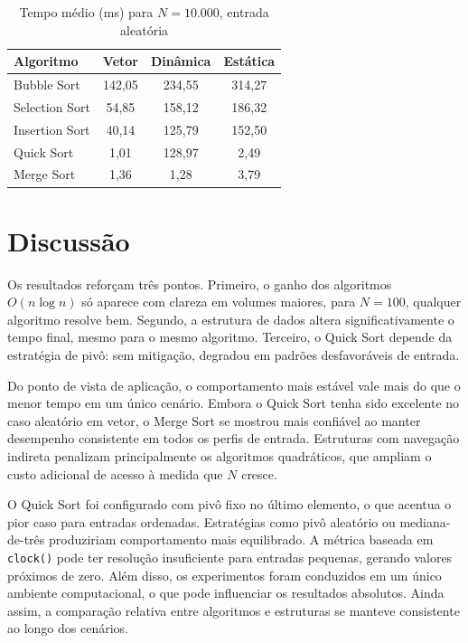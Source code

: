 \documentclass[conference]{IEEEtran}
\begin{document}
\begin{table}[htbp]
\centering
\caption{Tempo médio (ms) para $N=10.000$, entrada aleatória}
\label{tab:resultados}
\renewcommand{\arraystretch}{1.2}
\begin{tabular}{lccc}
\toprule
\textbf{Algoritmo} & \textbf{Vetor} & \textbf{Dinâmica} & \textbf{Estática} \\
\midrule
Bubble Sort    & 142,05 & 234,55 & 314,27 \\
Selection Sort &  54,85 & 158,12 & 186,32 \\
Insertion Sort &  40,14 & 125,79 & 152,50 \\
Quick Sort     &   1,01 & 128,97 &   2,49 \\
Merge Sort     &   1,36 &   1,28 &   3,79 \\
\bottomrule
\end{tabular}
\end{table}

\section{Discussão}

Os resultados reforçam três pontos. Primeiro, o ganho dos algoritmos $O(n \log n)$ só aparece com clareza em volumes maiores, para $N = 100$, qualquer algoritmo resolve bem. Segundo, a estrutura de dados altera significativamente o tempo final, mesmo para o mesmo algoritmo. Terceiro, o Quick Sort depende da estratégia de pivô: sem mitigação, degradou em padrões desfavoráveis de entrada.

Do ponto de vista de aplicação, o comportamento mais estável vale mais do que o menor tempo em um único cenário. Embora o Quick Sort tenha sido excelente no caso aleatório em vetor, o Merge Sort se mostrou mais confiável ao manter desempenho consistente em todos os perfis de entrada. Estruturas com navegação indireta penalizam principalmente os algoritmos quadráticos, que ampliam o custo adicional de acesso à medida que $N$ cresce.

O Quick Sort foi configurado com pivô fixo no último elemento, o que acentua o pior caso para entradas ordenadas. Estratégias como pivô aleatório ou mediana-de-três produziriam comportamento mais equilibrado. A métrica baseada em \texttt{clock()} pode ter resolução insuficiente para entradas pequenas, gerando valores próximos de zero. Além disso, os experimentos foram conduzidos em um único ambiente computacional, o que pode influenciar os resultados absolutos. Ainda assim, a comparação relativa entre algoritmos e estruturas se manteve consistente ao longo dos cenários.
\end{document}
